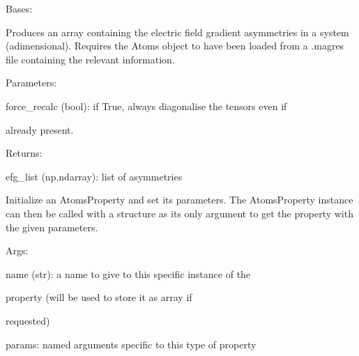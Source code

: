 \documentclass[letterpaper,10pt,english]{sphinxmanual}
\begin{document}
\begin{fulllineitems}
\label{doctree/soprano.properties.nmr.efg:soprano.properties.nmr.efg.EFGAsymmetry}
Bases: {\hyperref[doctree/soprano.properties.atomsproperty:soprano.properties.atomsproperty.AtomsProperty]{\emph{}}}

Produces an array containing the electric field gradient asymmetries
in a system (adimensional).
Requires the Atoms object to have been loaded from a .magres file
containing the relevant information.

\begin{DUlineblock}{0em}
\item[] Parameters:
\item[]
\begin{DUlineblock}{\DUlineblockindent}
\item[] force\_recalc (bool): if True, always diagonalise the tensors even if
\item[]
\begin{DUlineblock}{\DUlineblockindent}
\item[] already present.
\end{DUlineblock}
\end{DUlineblock}
\end{DUlineblock}

\begin{DUlineblock}{0em}
\item[] Returns:
\item[]
\begin{DUlineblock}{\DUlineblockindent}
\item[] efg\_list (np.ndarray): list of asymmetries
\end{DUlineblock}
\end{DUlineblock}

Initialize an AtomsProperty and set its parameters.
The AtomsProperty instance can then be called with a structure as its
only argument to get the property with the given parameters.

\begin{DUlineblock}{0em}
\item[] Args:
\item[]
\begin{DUlineblock}{\DUlineblockindent}
\item[] name (str): a name to give to this specific instance of the
\item[]
\begin{DUlineblock}{\DUlineblockindent}
\item[] property (will be used to store it as array if
\item[] requested)
\end{DUlineblock}
\item[] params: named arguments specific to this type of property
\end{DUlineblock}
\end{DUlineblock}


\end{fulllineitems}
\end{document}

